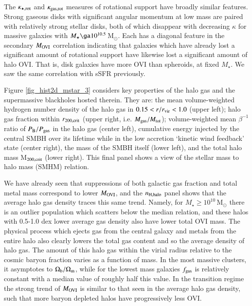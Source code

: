 \documentclass[useAMS,usenatbib]{mnras}
\newcommand{\msun}{\,M$_{\odot}$\xspace}
\newcommand{\ovi}{OVI\xspace}
\begin{document}
The $\kappa_{\rm \star,rot}$ and $\kappa_{\rm gas,rot}$ measures of rotational support \citep[e.g.][]{sales12} have broadly similar features. Strong gaseous disks with significant angular momentum at low mass are paired with relatively strong stellar disks, both of which disappear with decreasing $\kappa$ for massive galaxies with $M_\star \ga 10^{10.5}$\msun. Each has a diagonal feature in the secondary $M_{\rm OVI}$ correlation indicating that galaxies which have already lost a significant amount of rotational support have likewise lost a significant amount of halo \ovi. That is, disk galaxies have more \ovi than spheroids, at fixed $M_\star$. We saw the same correlation with sSFR previously.

Figure \ref{fig_hist2d_mstar_3} considers key properties of the halo gas and the supermassive blackholes hosted therein. They are: the mean volume-weighted hydrogen number density of the halo gas in $0.15 < r/r_{\rm vir} < 1.0$ (upper left); halo gas fraction within $r_{\rm 200,crit}$ (upper right, i.e. $M_{\rm gas} / M_{\rm tot}$); volume-weighted mean $\beta^{-1}$ ratio of $P_{\rm B} / P_{\rm gas}$ in the halo gas (center left), cumulative energy injected by the central SMBH over its lifetime while in the low accretion `kinetic wind feedback' state (center right), the mass of the SMBH itself (lower left), and the total halo mass M$_{\rm 200,crit}$ (lower right). This final panel shows a view of the stellar mass to halo mass (SMHM) relation.

We have already seen that suppressions of both galactic gas fraction and total metal mass correspond to lower $M_{\rm OVI}$, and the $n_{\rm H,halo}$ panel shows that the average halo gas density traces this same trend. Namely, for $M_\star \ge 10^{10}$\msun there is an outlier population which scatters below the median relation, and these halos with 0.5-1.0 dex lower average gas density also have lower total \ovi mass. The physical process which ejects gas from the central galaxy and metals from the entire halo also clearly lowers the total gas content and so the average density of halo gas.
The amount of this halo gas within the virial radius relative to the cosmic baryon fraction varies as a function of mass. In the most massive clusters, it asymptotes to $\Omega_{\rm b} / \Omega_{\rm m}$, while for the lowest mass galaxies $f_{\rm gas}$ is relatively constant with a median value of roughly half this value. In the transition regime the strong trend of $M_{\rm OVI}$ is similar to that seen in the average halo gas density, such that more baryon depleted halos have progressively less \ovi.
\end{document}
